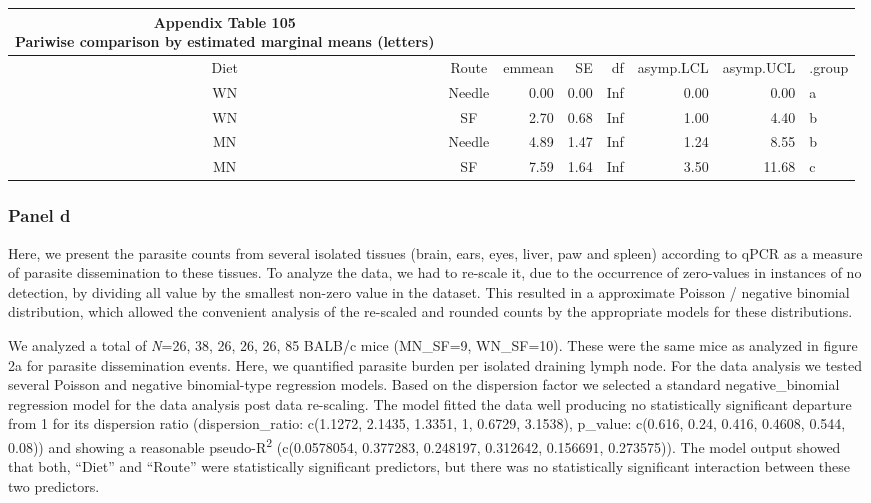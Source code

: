 \documentclass[
  12pt,
  letterpaper,
]{article}
\begin{document}
\begin{longtable}{ccrrrrrl}
\caption*{
{\large \textbf{Appendix Table 105}} \\ 
{\small \textbf{Pariwise comparison by estimated marginal means (letters)}}
} \\ 
\toprule
Diet & Route & emmean & SE & df & asymp.LCL & asymp.UCL & .group \\ 
\midrule\addlinespace[2.5pt]
WN & Needle & 0.00 & 0.00 & Inf & 0.00 & 0.00 &  a   \\ 
WN & SF & 2.70 & 0.68 & Inf & 1.00 & 4.40 &   b  \\ 
MN & Needle & 4.89 & 1.47 & Inf & 1.24 & 8.55 &   b  \\ 
MN & SF & 7.59 & 1.64 & Inf & 3.50 & 11.68 &    c \\ 
\bottomrule
\end{longtable}

\subsubsection{Panel d}\label{panel-d-1}

Here, we present the parasite counts from several isolated tissues (brain, ears, eyes, liver, paw and spleen) according to qPCR as a measure of parasite dissemination to these tissues. To analyze the data, we had to re-scale it, due to the occurrence of zero-values in instances of no detection, by dividing all value by the smallest non-zero value in the dataset. This resulted in a approximate Poisson / negative binomial distribution, which allowed the convenient analysis of the re-scaled and rounded counts by the appropriate models for these distributions.

We analyzed a total of \emph{N}=26, 38, 26, 26, 26, 85 BALB/c mice (MN\_SF=9, WN\_SF=10). These were the same mice as analyzed in figure 2a for parasite dissemination events. Here, we quantified parasite burden per isolated draining lymph node. For the data analysis we tested several Poisson and negative binomial-type regression models. Based on the dispersion factor we selected a standard negative\_binomial regression model for the data analysis post data re-scaling. The model fitted the data well producing no statistically significant departure from 1 for its dispersion ratio (dispersion\_ratio: c(1.1272, 2.1435, 1.3351, 1, 0.6729, 3.1538), p\_value: c(0.616, 0.24, 0.416, 0.4608, 0.544, 0.08)) and showing a reasonable pseudo-R\textsuperscript{2} (c(0.0578054, 0.377283, 0.248197, 0.312642, 0.156691, 0.273575)). The model output showed that both, ``Diet'' and ``Route'' were statistically significant predictors, but there was no statistically significant interaction between these two predictors.
\end{document}
